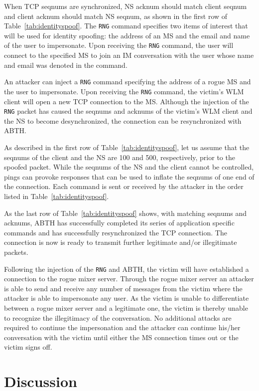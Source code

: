 \documentclass{sig-alternate}
\begin{document}
When TCP seqnums are synchronized, NS acknum should match client seqnum and client acknum should match NS seqnum, as shown in the first row of Table~\ref{tab:identityspoof}.
The \texttt{RNG} command specifies two items of interest that will be used for identity spoofing: the address of an MS and the email and name of the user to impersonate.
Upon receiving the \texttt{RNG} command, the user will connect to the specified MS to join an IM conversation with the user whose name and email was denoted in the command.

An attacker can inject a \texttt{RNG} command specifying the address of a rogue MS and the user to impersonate.
Upon receiving the \texttt{RNG} command, the victim's WLM client will open a new TCP connection to the MS.
Although the injection of the \texttt{RNG} packet has caused the seqnums and acknums of the victim's WLM client and the NS to become desynchronized, the connection can be resynchronized with ABTH.

As described in the first row of Table~\ref{tab:identityspoof}, let us assume that the seqnums of the client and the NS are 100 and 500, respectively, prior to the spoofed packet.
While the seqnums of the NS and the client cannot be controlled, pings can provoke responses that can be used to inflate the seqnums of one end of the connection.
Each command is sent or received by the attacker in the order listed in Table~\ref{tab:identityspoof}.

As the last row of Table~\ref{tab:identityspoof} shows, with matching seqnums and acknums, ABTH has successfully completed its series of application specific commands and has successfully resynchronized the TCP connection.
The connection is now is ready to transmit further legitimate and/or illegitimate packets.

Following the injection of the \texttt{RNG} and ABTH, the victim will have established a connection to the rogue mixer server.
Through the rogue mixer server an attacker is able to send and receive any number of messages from the victim where the attacker is able to impersonate any user.
As the victim is unable to differentiate between a rogue mixer server and a legitimate one, the victim is thereby unable to recognize the illegitimacy of the conversation.
No additional attacks are required to continue the impersonation and the attacker can continue his/her conversation with the victim until either the MS connection times out or the victim signs off.

\section{Discussion}
\label{sec:discussion}
\end{document}
